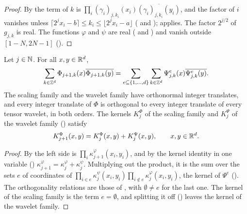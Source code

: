 \begin{proof}
\leanok
{}
By  the term of $k$ is
$\prod_i (\gamma_i)_{j,k_i}(x_i) \overline{(\gamma_i)_{j,k_i}(y_i)}$, and the factor of $i$ vanishes
unless $\lceil 2^j x_i - b \rceil \leq k_i \leq \lfloor 2^j x_i - a \rfloor$
( and ); 
applies. The factor $2^{j/2}$ of $g_{j,k}$ is real. The functions $\varphi$ and $\psi$ are real
( and ) and vanish outside
$[1 - N, 2N - 1]$ ().
\end{proof}

\begin{proposition}
\label{prop:daub-rd-kernel-identity}
\leanok
{}
Let $j \in \mathbb{N}$. For all $x, y \in \mathbb{R}^d$,
\[
  \sum_{k \in \mathbb{Z}^d} \Phi_{j+1,k}(x) \overline{\Phi_{j+1,k}(y)}
  = \sum_{e \subseteq \{1, \dots, d\}} \sum_{k \in \mathbb{Z}^d}
    \Psi^e_{j,k}(x) \overline{\Psi^e_{j,k}(y)} .
\]
The scaling family and the wavelet family have orthonormal integer translates, and every integer
translate of $\Phi$ is orthogonal to every integer translate of every tensor wavelet, in both
orders. The kernels
$K^\Phi_j$ of the scaling family and $K^\Psi_j$ of the wavelet family
() satisfy
\[
  K^\Phi_{j+1}(x, y) = K^\Phi_j(x, y) + K^\Psi_j(x, y) , \qquad x, y \in \mathbb{R}^d .
\]
\end{proposition}

\begin{proof}
\leanok
{}
By  the left side is $\prod_i \kappa^\varphi_{j+1}(x_i, y_i)$,
and by the kernel identity in one variable ()
$\kappa^\varphi_{j+1} = \kappa^\varphi_j + \kappa^\psi_j$. Multiplying out the product, it is
the sum over the sets $e$ of coordinates of
$\prod_{i \in e} \kappa^\psi_j(x_i, y_i) \prod_{i \notin e} \kappa^\varphi_j(x_i, y_i)$, the
kernel of $\Psi^e$ (). The orthogonality relations are those of
, with $\emptyset \neq e$ for the last one. The kernel of the
scaling family is the term $e = \emptyset$, and splitting it off ()
leaves the kernel of the wavelet family.
\end{proof}

